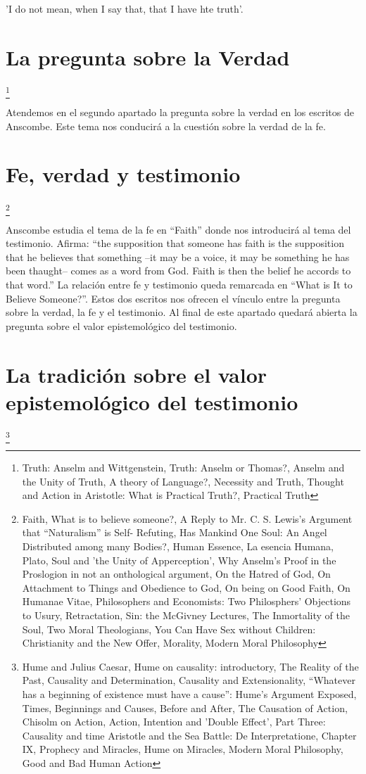 \documentclass[../main.tex]{subfiles}
\begin{document}
'I do not mean, when I say that, that I have hte truth'.

\section{La pregunta sobre la Verdad}
\footnote{
Truth: Anselm and Wittgenstein, 
Truth: Anselm or Thomas?, 
Anselm and the Unity of Truth, 
A theory of Language?, 
Necessity and Truth, 
Thought and Action in Aristotle: What is Practical Truth?, 
Practical Truth
}

Atendemos en el segundo apartado la pregunta sobre la verdad en los escritos de Anscombe. Este tema nos conducirá a la cuestión sobre la verdad de la fe.

\section{Fe, verdad y testimonio}
\footnote{
Faith, 
What is to believe someone?, 
A Reply to Mr. C. S. Lewis's Argument that “Naturalism” is Self- Refuting, 
Has Mankind One Soul: An Angel Distributed among many Bodies?, 
Human Essence, 
La esencia Humana, 
Plato, Soul and 'the Unity of Apperception', 
Why Anselm's Proof in the Proslogion in not an onthological argument, 
On the Hatred of God, 
On Attachment to Things and Obedience to God, 
On being on Good Faith, 
On Humanae Vitae, 
Philosophers and Economists: Two Philosphers' Objections to Usury, 
Retractation, 
Sin: the McGivney Lectures, 
The Inmortality of the Soul, 
Two Moral Theologians, 
You Can Have Sex without Children: Christianity and the New Offer, 
Morality, 
Modern Moral Philosophy
}

Anscombe estudia el tema de la fe en ``Faith'' donde nos introducirá al tema del testimonio. Afirma: ``the supposition that someone has faith is the supposition that he believes that something --it may be a voice, it may be something he has been thaught-- comes as a word from God. Faith is then the belief he accords to that word.'' La relación entre fe y testimonio queda remarcada en ``What is It to Believe Someone?''. Estos dos escritos nos ofrecen el vínculo entre la pregunta sobre la verdad, la fe y el testimonio. Al final de este apartado quedará abierta la pregunta sobre el valor epistemológico del testimonio.

\section{La tradición sobre el valor epistemológico del testimonio}
\footnote{
Hume and Julius Caesar, 
Hume on causality: introductory, 
The Reality of the Past, 
Causality and Determination, 
Causality and Extensionality, 
“Whatever has a beginning of existence must have a cause”: Hume's Argument Exposed, 
Times, Beginnings and Causes, 
Before and After, 
The Causation of Action, 
Chisolm on Action, 
Action, Intention and 'Double Effect', 
Part Three: Causality and time
Aristotle and the Sea Battle: De Interpretatione, Chapter IX, 
Prophecy and Miracles, 
Hume on Miracles, 
Modern Moral Philosophy, 
Good and Bad Human Action
}
\end{document}
